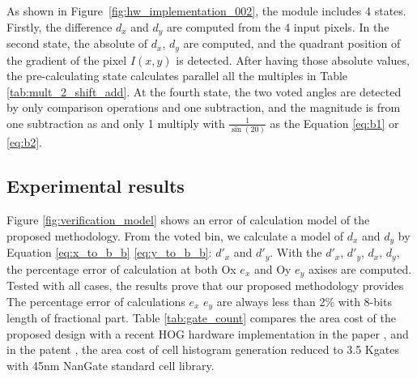 As shown in Figure~\ref{fig:hw_implementation_002}, the module includes 4
states.
 Firstly, the difference $d_x$ and $d_y$ are computed from the 4 input
pixels.
In the second state, the absolute of $d_x$, $d_y$ are computed, and the quadrant
position of the gradient of the pixel $I(x,y)$ is  detected.
After having those absolute values, the pre-calculating state calculates
parallel all the multiples in Table \ref{tab:mult_2_shift_add}.
At the fourth state, the two voted angles are detected by only comparison
operations and one subtraction, and the magnitude is  from one subtraction as and
only 1 multiply with $\frac{1}{\sin(20)}$ as the Equation \ref{eq:b1} or
\ref{eq:b2}.

\subsection{Experimental results}
\label{sub:experimental_results}

Figure \ref{fig:verification_model} shows an error of calculation model of the
proposed methodology.
From the voted bin, we calculate a model of $d_x$ and $d_y$ by Equation
\ref{eq:x_to_b_b} \ref{eq:y_to_b_b}: $d'_x$ and $d'_y$.
With the $d'_x$, $d'_y$, $d_x$, $d_y$, the percentage error of calculation at both Ox $e_x$
and Oy $e_y$ axises are  computed.
Tested with all cases, the results prove that our proposed methodology provides
The  percentage error of calculations $e_x$ $e_y$ are always  less than 2\% with 8-bits length of
fractional part. Table \ref{tab:gate_count} compares the area cost of the
proposed design with a recent HOG hardware implementation in the
paper \cite{pei-yinchen2014ehia}, \cite{hsiao2016hdh} and in the patent
\cite{munteanu2016mph}, the area cost of cell histogram generation reduced to
3.5 Kgates with 45nm NanGate standard cell library.

